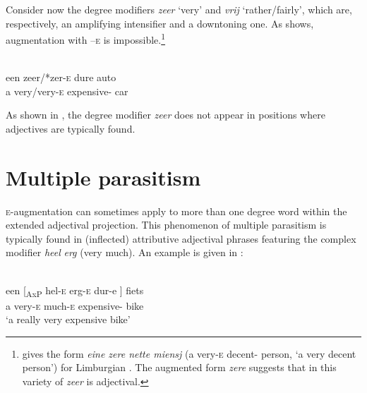 \documentclass[output=paper]{langsci/langscibook}
\begin{document}
Consider now the degree modifiers \emph{zeer} \enquote*{very} and \emph{vrij}
‘rather/fairly’, which are, respectively, an amplifying
intensifier and a downtoning one. As  shows,
augmentation with –\textsc{e} is impossible.\footnote{\citet{Verdenius1939}
    gives the form \emph{eine zere nette miensj} (a very-\textsc{e}
    decent-\Agr{} person, \enquote*{a very decent person}) for Limburgian
    . The augmented form \emph{zere} suggests that in this variety
of  \emph{zeer} is adjectival.}

\ea%
    \label{ex:key:18.15}\\
    \gll een   zeer/*zer-\textsc{e}    dure                      auto\\
        a        very/very-\textsc{e}    expensive-\Agr{}    car\\
    \glt
\z

As shown in , the degree modifier \emph{zeer} does not appear in
positions where adjectives are typically found.

\ea%
    \label{ex:key:18.16}
	\z
\z

\section{Multiple parasitism}\label{sec:key:18.4}

\textsc{e-}augmentation can sometimes apply to more than one degree word within
the extended adjectival projection. This phenomenon of multiple parasitism is
typically found in (inflected) attributive adjectival phrases featuring the
complex modifier \emph{heel} \emph{erg} (very much). An example is given in
:

\ea%
    \label{ex:key:18.17}\\
    \gll  een    [\textsubscript{AxP} hel-\textsc{e}    erg-\textsc{e}
    dur-e ]          fiets\\
    a   {}         very-\textsc{e}    much-\textsc{e}  expensive-\Agr{} {} bike\\
    \glt \enquote*{a really very expensive bike}
\z
\end{document}
